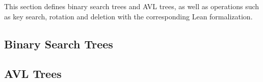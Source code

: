This section defines binary search trees and AVL trees, as well as operations such as key search, rotation and deletion with the corresponding Lean formalization.

\subsection{Binary Search Trees}


\subsection{AVL Trees}
